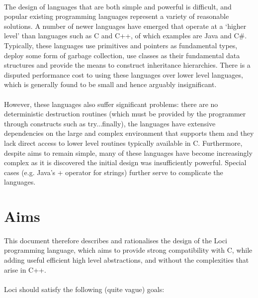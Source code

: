 \documentclass[12pt,twoside,notitlepage]{report}
\begin{document}
\paragraph{}
The design of languages that are both simple and powerful is difficult, and popular existing programming languages represent a variety of reasonable solutions. A number of newer languages have emerged that operate at a `higher level' than languages such as C and C++, of which examples are Java and C\#. Typically, these languages use primitives and pointers as fundamental types, deploy some form of garbage collection, use classes as their fundamental data structures and provide the means to construct inheritance hierarchies. There is a disputed performance cost to using these languages over lower level languages, which is generally found to be small and hence arguably insignificant.

\paragraph{}
However, these languages also suffer significant problems: there are no deterministic destruction routines (which must be provided by the programmer through constructs such as try...finally), the languages have extensive dependencies on the large and complex environment that supports them and they lack direct access to lower level routines typically available in C. Furthermore, despite aims to remain simple, many of these languages have become increasingly complex as it is discovered the initial design was insufficiently powerful. Special cases (e.g. Java's + operator for strings) further serve to complicate the languages.

\section{Aims}

\paragraph{}
This document therefore describes and rationalises the design of the Loci programming language, which aims to provide strong compatibility with C, while adding useful efficient high level abstractions, and without the complexities that arise in C++.

\paragraph{}
Loci should satisfy the following (quite vague) goals:
\end{document}
